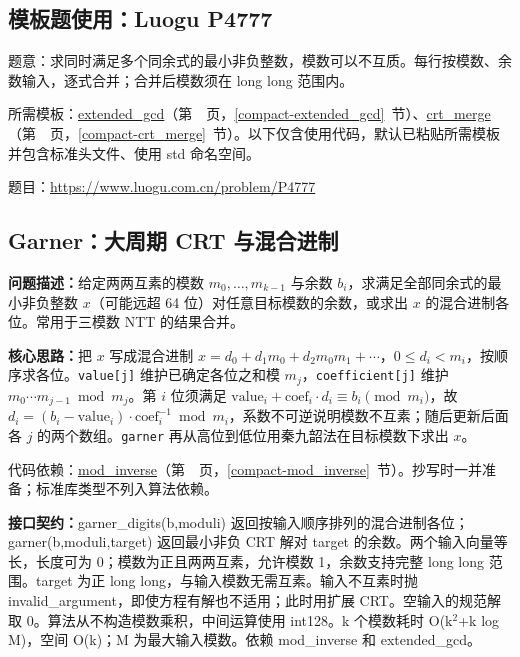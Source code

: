 

\Needspace{381pt}

\subsection*{模板题使用：Luogu P4777}

\label{usage-example-15}

题意：求同时满足多个同余式的最小非负整数，模数可以不互质。每行按模数、余数输入，逐式合并；合并后模数须在 long long 范围内。

所需模板：\hyperref[compact-extended_gcd]{extended\_\allowbreak{}gcd}（第~\pageref{compact-extended_gcd}~页，\ref{compact-extended_gcd}~节）、\hyperref[compact-crt_merge]{crt\_\allowbreak{}merge}（第~\pageref{compact-crt_merge}~页，\ref{compact-crt_merge}~节）。以下仅含使用代码，默认已粘贴所需模板并包含标准头文件、使用 std 命名空间。

题目：\url{https://www.luogu.com.cn/problem/P4777}



\Needspace{663pt}

\subsection{Garner：大周期 CRT 与混合进制}\label{compact-garner}

\noindent\textbf{问题描述：}\allowbreak 给定两两互素的模数 $m_0,\dots,m_{k-1}$ 与余数 $b_i$，求满足全部同余式的最小非负整数 $x$（可能远超 64 位）对任意目标模数的余数，或求出 $x$ 的混合进制各位。常用于三模数 NTT 的结果合并。

\textbf{核心思路：}\allowbreak 把 $x$ 写成混合进制 $x=d_0+d_1m_0+d_2m_0m_1+\cdots$，$0\le d_i<m_i$，按顺序求各位。\texttt{value[j]} 维护已确定各位之和模 $m_j$，\texttt{coefficient[j]} 维护 $m_0\cdots m_{j-1}\bmod m_j$。第 $i$ 位须满足 $\mathrm{value}_i+\mathrm{coef}_i\cdot d_i\equiv b_i\pmod{m_i}$，故 $d_i=(b_i-\mathrm{value}_i)\cdot\mathrm{coef}_i^{-1}\bmod m_i$，系数不可逆说明模数不互素；随后更新后面各 $j$ 的两个数组。\texttt{garner} 再从高位到低位用秦九韶法在目标模数下求出 $x$。

代码依赖：\hyperref[compact-mod_inverse]{mod\_\allowbreak{}inverse}（第~\pageref{compact-mod_inverse}~页，\ref{compact-mod_inverse}~节）。抄写时一并准备；标准库类型不列入算法依赖。

{\sloppy{}\noindent\textbf{接口契约：}garner\_digits(b,moduli) 返回按输入顺序排列的混合进制各位；garner(b,moduli,target) 返回最小非负 CRT 解对 target 的余数。两个输入向量等长，长度可为 0；模数为正且两两互素，允许模数 1，余数支持完整 long long 范围。target 为正 long long，与输入模数无需互素。输入不互素时抛 invalid\_argument，即使方程有解也不适用；此时用扩展 CRT。空输入的规范解取 0。算法从不构造模数乘积，中间运算使用 int128。k 个模数耗时 O(k$^{2}$+k log M)，空间 O(k)；M 为最大输入模数。依赖 mod\_inverse 和 extended\_gcd。\par}


